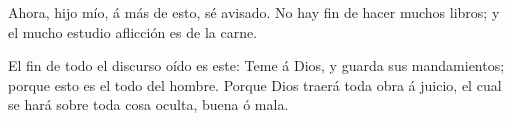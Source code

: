  Ahora, hijo mío, á más de esto, sé avisado. No hay fin de
hacer muchos libros; y el mucho estudio aflicción es de la carne.

 El fin de todo el discurso oído es este: Teme á Dios, y
guarda sus mandamientos; porque esto es el todo del hombre.
 Porque Dios traerá toda obra á juicio, el cual se hará
sobre toda cosa oculta, buena ó mala.
